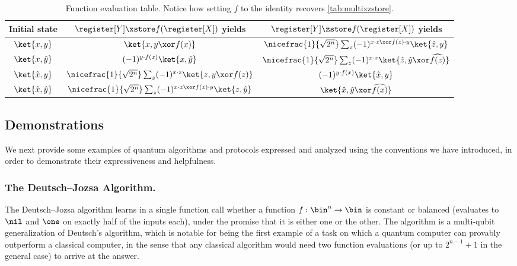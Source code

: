     \begin{table}[h!]
      \caption{
        \label{tab:fxzstore}
        Function evaluation table.
        Notice how setting $f$ to the identity recovers
        \cref{tab:multixzstore}.
      }
      \centering
        \begin{tabular}{ccc}
          \toprule
          Initial state & $\register[Y] \xstore f(\register[X])$ yields & $\register[Y] \zstore f(\register[X])$ yields\\
          \midrule
          $\ket{x,y}$ & $\ket{x,y \xor f(x)}$ & 
            $\nicefrac{1}{\sqrt{2^n}} \sum_z (-1)^{x \cdot z \xor f(z) \cdot y}\ket{\hat{z}, y}$ \\
          $\ket{x,\hat y}$ & $(-1)^{y \cdot f(x)}\ket{x, \hat y}$ & 
            $\nicefrac{1}{\sqrt{2^n}} \sum_z (-1)^{x \cdot z}\ket{\hat z, \hat y \xor \widehat{f(z)}}$
            \\
          $\ket{\hat x, y}$ & 
            $\nicefrac{1}{\sqrt{2^n}} \sum_z (-1)^{x \cdot z}\ket{z, y \xor f(z)}$
            & $(-1)^{y \cdot f(x)}\ket{\hat x, y}$ \\
          $\ket{\hat x,\hat y}$ & 
            $\nicefrac{1}{\sqrt{2^n}} \sum_z (-1)^{x \cdot z \xor f(z) \cdot y}\ket{z, \hat y}$
            & $\ket{\hat x, \hat y \xor \widehat{f(x)}}$ \\
          \bottomrule
        \end{tabular}
    \end{table}

  \subsection{Demonstrations}
    We next provide some examples of quantum algorithms and protocols expressed
      and analyzed using the conventions we have introduced, in order to
      demonstrate their expressiveness and helpfulness.

    \subsubsection{The Deutsch--Jozsa Algorithm.}
      The Deutsch--Jozsa algorithm learns in a single function call whether a function
        $f: \bin^n \to \bin$ is constant or balanced (evaluates to $\nil$ and
        $\one$ on exactly half of the inputs each), under the promise that it
        is either one or the other. The algorithm is a multi-qubit
        generalization of Deutsch's algorithm, which is notable for being
        the first example of a task on which a quantum computer can provably outperform 
        a classical computer, in the sense that any classical algorithm would need
        two function evaluations (or up to $2^{n-1} + 1$ in
        the general case) to arrive at the answer.

